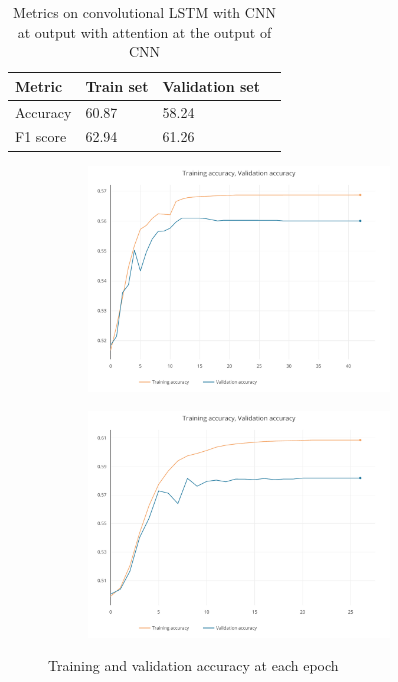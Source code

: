 \documentclass[journal]{IEEEtran}
\begin{document}
\begin{table}[H]
	\caption{Metrics on convolutional LSTM with CNN at output with attention at the output of CNN}
	\centering
	\begin{tabular}{llll}
		\toprule
		Metric & Train set & Validation set
		\\
		\midrule
		Accuracy & 60.87 & 58.24
		\\
		F1 score & 62.94 & 61.26
		\\
		\bottomrule
	\end{tabular}
	\label{tab: cnnconv}
\end{table}

\begin{figure}[h]
	\centering
	
	\begin{subfigure}{0.49\textwidth}
		\centering
		\includegraphics[height = 6cm]{Images/accuracy.pdf}
	\end{subfigure}
	\hspace{1mm}
	\begin{subfigure}{0.49\textwidth}
		\centering
		\includegraphics[height = 6cm]{Images/accuracy1.pdf}
	\end{subfigure}
	
	\caption{Training and validation accuracy at each epoch}
\end{figure}
\end{document}
